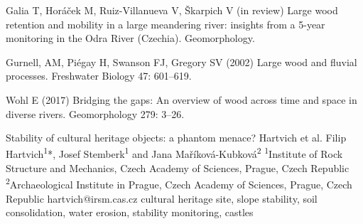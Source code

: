 {Galia T, Horáček M, Ruiz-Villanueva V, Škarpich V (in review) Large wood retention and mobility in a large meandering river: insights from a 5-year monitoring in the Odra River (Czechia). Geomorphology.
	
Gurnell, AM, Piégay H, Swanson FJ, Gregory SV (2002) Large wood and fluvial processes. Freshwater Biology 47: 601–619.
	
Wohl E (2017) Bridging the gaps: An overview of wood across time and space in diverse rivers. Geomorphology 279: 3–26.
}%

\abstract
{Stability of cultural heritage objects: a phantom menace?} 
{Hartvich et al.} 
{Filip Hartvich\textsuperscript{1}*, Josef Stemberk\textsuperscript{1} and Jana Maříková-Kubková\textsuperscript{2}} 
{\TLtag} 
{
\textsuperscript{1}Institute of Rock Structure and Mechanics, Czech Academy of Sciences, Prague, Czech Republic
\textsuperscript{2}Archaeological Institute in Prague, Czech Academy of Sciences, Prague, Czech Republic
}
{hartvich@irsm.cas.cz}  %
{cultural heritage site, slope stability, soil consolidation, water erosion, stability monitoring, castles}
